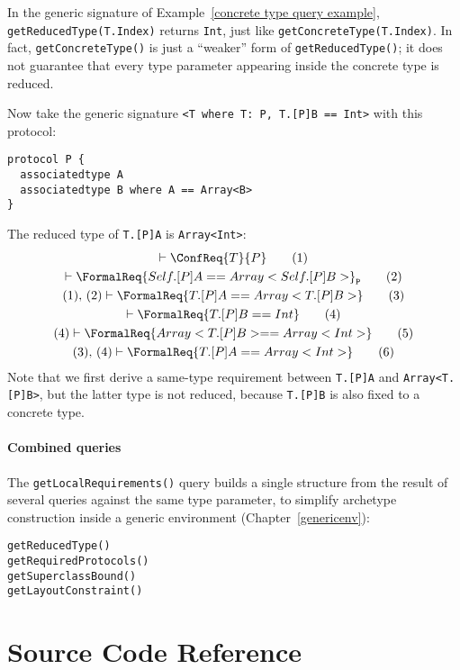 \documentclass[../generics]{subfiles}
\begin{document}
\begin{example}
In the generic signature of Example~\ref{concrete type query example}, \texttt{getReducedType(T.Index)} returns \texttt{Int}, just like \texttt{getConcreteType(T.Index)}. In fact, \texttt{getConcreteType()} is just a ``weaker'' form of \texttt{getReducedType()}; it does not guarantee that every type parameter appearing inside the concrete type is reduced.

Now take the generic signature \verb|<T where T: P, T.[P]B == Int>| with this protocol:
\begin{Verbatim}
protocol P {
  associatedtype A
  associatedtype B where A == Array<B>
}
\end{Verbatim}
The reduced type of \texttt{T.[P]A} is \texttt{Array<Int>}:
\begin{gather}
\vdash \ConfReq{T}{P}\tag{1}\\
\vdash \FormalReq{Self.[P]A == Array<Self.[P]B>}_\texttt{P}\tag{2}\\
(1),\,(2)\vdash \FormalReq{T.[P]A == Array<T.[P]B>}\tag{3}\\
\vdash \FormalReq{T.[P]B == Int}\tag{4}\\
(4)\vdash \FormalReq{Array<T.[P]B> == Array<Int>}\tag{5}\\
(3),\,(4)\vdash\FormalReq{T.[P]A == Array<Int>}\tag{6}
\end{gather}
Note that we first derive a same-type requirement between \texttt{T.[P]A} and \texttt{Array<T.[P]B>}, but the latter type is not reduced, because \texttt{T.[P]B} is also fixed to a concrete type.
\end{example}

\paragraph{Combined queries}


The \texttt{getLocalRequirements()} query builds a single structure from the result of several queries against the same type parameter, to simplify archetype construction inside a generic environment (Chapter~\ref{genericenv}):
\begin{verbatim}
getReducedType()
getRequiredProtocols()
getSuperclassBound()
getLayoutConstraint()
\end{verbatim}

\section{Source Code Reference}\label{genericsigsourceref}
\end{document}
